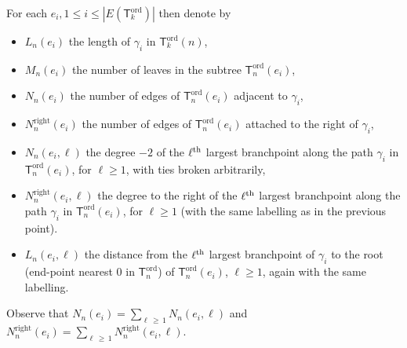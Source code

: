 \documentclass[AHL,Unicode,longabstracts,published]{cedram}
\newcommand{\ord}{\mathrm{ord}}
\newcommand{\Rightll}{\mathrm{right}}
\newcommand{\sT}{\mathsf{T}}
\begin{document}
For each $e_i, 1 \le i \le |E(\sT_k^{\ord})|$ then denote by
\begin{itemize}
\item $L_{n}(e_i)$ the length of $\gamma_i$ in $\sT^{\ord}_{k}(n)$,
\item $M_{n}(e_i)$ the number of leaves in the subtree $\sT_n^{\ord}(e_i)$,
\item $N_{n}(e_i)$ the number of edges of $\sT^{\ord}_n(e_i)$ adjacent to $\gamma_i$,
\item $N^{\Rightll}_{n}(e_i)$ the number of edges of $\sT^{\ord}_n(e_i)$ attached to the right of $\gamma_i$,
\item $N_n(e_i, \ell)$ the degree $-2$ of the $\ell^{\rm th}$ largest branchpoint along the path $\gamma_i$ in $\sT^{\ord}_n(e_i)$, for $\ell \ge 1$, with ties broken arbitrarily,
\item $N^{\Rightll}_n(e_i, \ell)$ the degree to the right of the $\ell^{\rm th}$ largest branchpoint along the path $\gamma_i$ in $\sT^{\ord}_n(e_i)$, for $\ell \ge 1$ (with the same labelling as in the previous point).
\item $L_n(e_i,\ell)$ the distance from the $\ell^{\rm th}$ largest branchpoint of $\gamma_i$ to the root (end-point nearest 0 in $\sT^{\ord}_n$) of $\sT^{\ord}_n(e_i)$, $\ell\geq 1$, again with the same labelling.
\end{itemize}
Observe that $N_n(e_i) = \sum_{\ell\,\ge\,1} N_n(e_i, \ell)$ and $N^{\Rightll}_{n}(e_i) = \sum_{\ell\,\ge\, 1} N^{\Rightll}_n(e_i, \ell)$.
\end{document}
